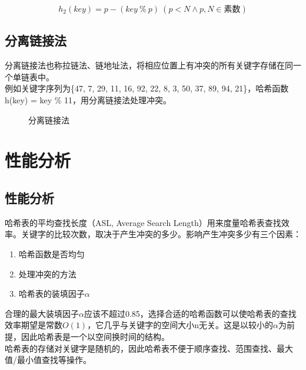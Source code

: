 $$
	h_2(key) = p - (key\ \%\ p)\ \left(p < N \wedge p, N \in \text{素数}\right)
$$

\subsection{分离链接法}

分离链接法也称拉链法、链地址法，将相应位置上有冲突的所有关键字存储在同一个单链表中。 \\

例如关键字序列为\{47, 7, 29, 11, 16, 92, 22, 8, 3, 50, 37, 89, 94, 21\}，哈希函数h(key) = key \% 11，用分离链接法处理冲突。

\begin{figure}[H]
	\centering
	\caption{分离链接法}
\end{figure}

\newpage

\section{性能分析}

\subsection{性能分析}

哈希表的平均查找长度（ASL, Average Search Length）用来度量哈希表查找效率。关键字的比较次数，取决于产生冲突的多少。影响产生冲突多少有三个因素：

\begin{enumerate}
	\item 哈希函数是否均匀
	\item 处理冲突的方法
	\item 哈希表的装填因子$ \alpha $
\end{enumerate}

合理的最大装填因子$ \alpha $应该不超过0.85，选择合适的哈希函数可以使哈希表的查找效率期望是常数$ O(1) $，它几乎与关键字的空间大小n无关。这是以较小的$ \alpha $为前提，因此哈希表是一个以空间换时间的结构。 \\

哈希表的存储对关键字是随机的，因此哈希表不便于顺序查找、范围查找、最大值/最小值查找等操作。

\newpage
